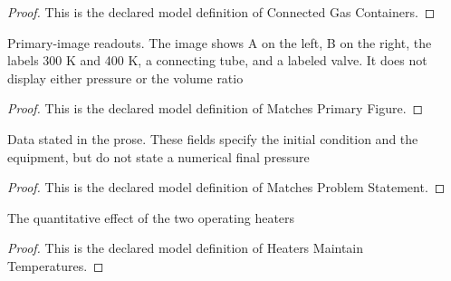 \begin{proof}
  This is the declared model definition of Connected Gas Containers.
\end{proof}
\begin{definition}
  \label{def:physics:phyx-mini-0376:phyxminiproblems-problemphyxmini0376-matchesprimaryfigure}
  Primary-image readouts. The image shows A on the left, B on the right, the labels 300 K and 400 K, a connecting tube, and a labeled valve. It does not display either pressure or the volume ratio
\end{definition}
\begin{proof}
  This is the declared model definition of Matches Primary Figure.
\end{proof}
\begin{definition}
  \label{def:physics:phyx-mini-0376:phyxminiproblems-problemphyxmini0376-matchesproblemstatement}
  Data stated in the prose. These fields specify the initial condition and the equipment, but do not state a numerical final pressure
\end{definition}
\begin{proof}
  This is the declared model definition of Matches Problem Statement.
\end{proof}
\begin{definition}
  \label{def:physics:phyx-mini-0376:phyxminiproblems-problemphyxmini0376-heatersmaintaintemperatures}
  The quantitative effect of the two operating heaters
\end{definition}
\begin{proof}
  This is the declared model definition of Heaters Maintain Temperatures.
\end{proof}
